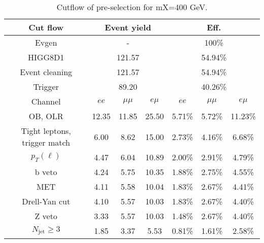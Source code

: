 \begin{table}
\centering\small
\begin{tabular}{c|ccc|ccc}
\hline
\hline
Cut flow &\multicolumn{3}{c|}{Event yield}&\multicolumn{3}{c}{Eff.}      \\
\hline
Evgen&\multicolumn{3}{c|}{-}&\multicolumn{3}{c}{100\%}\\
HIGG8D1&\multicolumn{3}{c|}{121.57}&\multicolumn{3}{c}{54.94\%}\\
Event cleaning&\multicolumn{3}{c|}{121.57}&\multicolumn{3}{c}{54.94\%}\\
Trigger&\multicolumn{3}{c|}{89.20    }&\multicolumn{3}{c}{40.26\%}\\
Channel&$ee$&$\mu\mu$&$e\mu$&$ee$&$\mu\mu$&$e\mu$\\
\hline
OB, OLR    &12.35    &11.85    &25.50& 5.71\%    &5.72\%    &11.23\%\\
Tight leptons, trigger match    &6.00    &8.62    &15.00    &2.73\%    &4.16\%    &6.68\%\\
$p_T(\ell)$    &4.47    &6.04    &10.89    &2.00\%    &2.91\%    &4.79\%\\
b veto    &4.24    &5.75    &10.35    &1.88\%    &2.75\%    &4.55\%\\
MET    &4.11    &5.58    &10.04    &1.83\%    &2.67\%    &4.41\%\\
Drell-Yan cut    &4.10    &5.57    &10.03    &1.83\%    &2.67\%    &4.40\%\\
Z veto    &3.33    &5.57    &10.03    &1.48\%    &2.67\%    &4.40\%\\
$N_{\text{jet}}\geq3$    &1.85    &3.37    &5.53    &0.81\%    &1.61\%    &2.58\%\\
\hline
\hline
\end{tabular}
\caption{Cutflow of pre-selection for mX=400 GeV.}
\label{tab:cut_flow_preselection_mX400}
\end{table}
